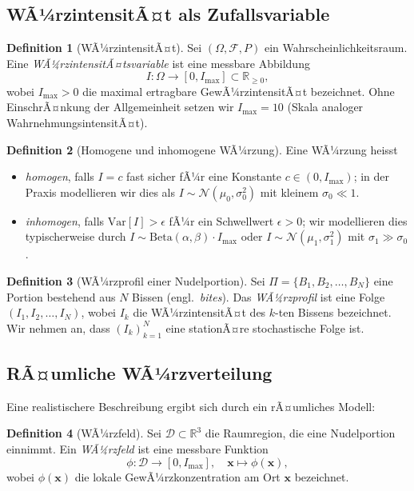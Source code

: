 ﻿\documentclass[12pt,a4paper]{article}
\theoremstyle{definition}
\newtheorem{definition}{Definition}[section]
\newcommand{\R}{\mathbb{R}}
\newcommand{\Var}{\mathrm{Var}}
\newcommand{\bx}{\mathbf{x}}
\begin{document}
\subsection{WÃ¼rzintensitÃ¤t als Zufallsvariable}

\begin{definition}[WÃ¼rzintensitÃ¤t]\label{def:wÃ¼rz}
Sei $(\Omega, \mathcal{F}, P)$ ein Wahrscheinlichkeitsraum. Eine
\emph{WÃ¼rzintensitÃ¤tsvariable} ist eine messbare Abbildung
\[
  I: \Omega \longrightarrow [0, I_{\max}] \subset \R_{\geq 0},
\]
wobei $I_{\max} > 0$ die maximal ertragbare GewÃ¼rzintensitÃ¤t bezeichnet.
Ohne EinschrÃ¤nkung der Allgemeinheit setzen wir $I_{\max} = 10$ (Skala
analoger WahrnehmungsintensitÃ¤t).
\end{definition}

\begin{definition}[Homogene und inhomogene WÃ¼rzung]\label{def:hominhom}
Eine WÃ¼rzung heisst
\begin{itemize}
  \item \emph{homogen}, falls $I = c$ fast sicher fÃ¼r eine Konstante $c \in (0, I_{\max})$;
  in der Praxis modellieren wir dies als $I \sim \mathcal{N}(\mu_0, \sigma_0^2)$
  mit kleinem $\sigma_0 \ll 1$.
  \item \emph{inhomogen}, falls $\Var[I] > \epsilon$ fÃ¼r ein
  Schwellwert $\epsilon > 0$; wir modellieren dies typischerweise durch
  $I \sim \mathrm{Beta}(\alpha, \beta) \cdot I_{\max}$ oder
  $I \sim \mathcal{N}(\mu_1, \sigma_1^2)$ mit $\sigma_1 \gg \sigma_0$.
\end{itemize}
\end{definition}

\begin{definition}[WÃ¼rzprofil einer Nudelportion]
Sei $\Pi = \{B_1, B_2, \ldots, B_N\}$ eine Portion bestehend aus $N$
Bissen (engl.\ \emph{bites}). Das \emph{WÃ¼rzprofil} ist eine Folge
$(I_1, I_2, \ldots, I_N)$, wobei $I_k$ die WÃ¼rzintensitÃ¤t des $k$-ten
Bissens bezeichnet. Wir nehmen an, dass $(I_k)_{k=1}^N$ eine stationÃ¤re
stochastische Folge ist.
\end{definition}

\subsection{RÃ¤umliche WÃ¼rzverteilung}

Eine realistischere Beschreibung ergibt sich durch ein rÃ¤umliches Modell:

\begin{definition}[WÃ¼rzfeld]
Sei $\mathcal{D} \subset \R^3$ die Raumregion, die eine Nudelportion
einnimmt. Ein \emph{WÃ¼rzfeld} ist eine messbare Funktion
\[
  \phi: \mathcal{D} \longrightarrow [0, I_{\max}],
  \quad \bx \mapsto \phi(\bx),
\]
wobei $\phi(\bx)$ die lokale GewÃ¼rzkonzentration am Ort $\bx$
bezeichnet.
\end{definition}
\end{document}
